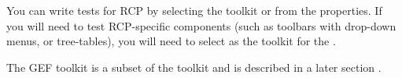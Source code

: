 You can write tests for RCP \gdauts{} by selecting the toolkit  or  from the \gdproject{} properties. If you will need to test RCP-specific components (such as toolbars with drop-down menus, or tree-tables), you will need to select  as the toolkit for the \gdproject{}. 

The GEF toolkit is a subset of the  toolkit and is described in a later section . 
